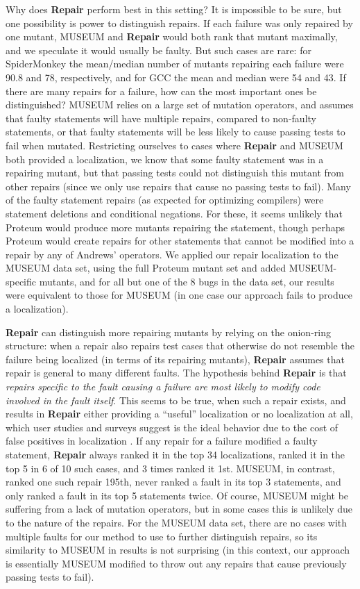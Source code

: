  Why does {\bf Repair} perform best in this setting?  It is impossible to be sure, but one  possibility is power to distinguish repairs. If each failure was only repaired by one mutant, MUSEUM and {\bf Repair} would both rank that mutant maximally, and we speculate it would usually be faulty.  But such cases are rare:  for SpiderMonkey the mean/median number of mutants repairing each failure were 90.8 and 78, respectively, and for GCC the mean and median were 54 and 43.  If there are many repairs for a failure, how can the most important ones be distinguished?  MUSEUM relies on a large set of mutation operators, and assumes that faulty statements will have multiple repairs, compared to non-faulty statements, or that faulty statements will be less likely to cause passing tests to fail when mutated.  Restricting ourselves to cases where {\bf Repair} and MUSEUM both provided a localization, we know that some faulty statement was in a repairing mutant, but that passing tests could not distinguish this mutant  from other repairs (since we only use repairs that cause no passing tests to fail).  Many of the faulty statement repairs (as expected for optimizing compilers) were statement deletions and conditional negations.  For these, it seems unlikely that Proteum would produce more mutants repairing the statement, though perhaps Proteum would create repairs for other statements that cannot be modified into a repair by any of Andrews' operators.  We applied our repair localization to the MUSEUM data set, using the full Proteum mutant set and added MUSEUM-specific mutants, and for all but one of the 8 bugs in the data set, our results were equivalent to those for MUSEUM (in one case our approach fails to produce a localization).

{\bf Repair} can distinguish more repairing mutants by relying on the onion-ring structure:  when a repair also repairs test cases that otherwise do not resemble the failure being localized (in terms of its repairing mutants), {\bf Repair} assumes that repair is general to many different faults.  The hypothesis behind {\bf Repair} is that \emph{repairs specific to the fault causing a failure are most likely to modify code involved in the fault itself}.  This seems to be true, when such a repair exists, and results in {\bf Repair} either providing a ``useful'' localization or no localization at all, which user studies and surveys suggest is the ideal behavior due to the cost of false positives in localization \cite{AutoHelp,Kochhar}.  If any repair for a failure modified a faulty statement, {\bf Repair} always ranked it in the top 34 localizations, ranked it in the top 5 in 6 of 10 such cases, and 3 times ranked it 1st.  MUSEUM, in contrast, ranked one such repair 195th, never ranked a fault in its top 3 statements, and only ranked a fault in its top 5 statements twice.  Of course, MUSEUM might be suffering from a lack of mutation operators, but in some cases this is unlikely due to the nature of the repairs.  For the MUSEUM data set, there are no cases with multiple faults for our method to use to further distinguish repairs, so its similarity to MUSEUM in results is not surprising (in this context, our approach is essentially MUSEUM modified to throw out any repairs that cause previously passing tests to fail).

